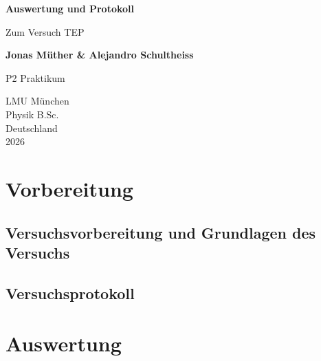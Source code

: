 \documentclass{report}
\begin{document}

\begin{titlepage}
    \begin{center}
        \vspace*{1cm}
            
        \Huge
        \textbf{Auswertung und Protokoll}
            
        \vspace{0.5cm}
        \LARGE
        Zum Versuch TEP
        
        \vspace{1.8cm}

        \textbf{Jonas Müther \& Alejandro Schultheiss}
        \vfill
            
        P2 Praktikum\\
       
            
        \vspace{0.8cm}
  

        \vspace{1.8cm}
        \Large
        LMU München \\
        Physik B.Sc.\\
        Deutschland\\
        2026
            
    \end{center}
\end{titlepage}
\tableofcontents

\newpage
\chapter{Vorbereitung}

\section{Versuchsvorbereitung und Grundlagen des Versuchs}


\section{Versuchsprotokoll}


\newpage
\chapter{Auswertung}
\end{document}
